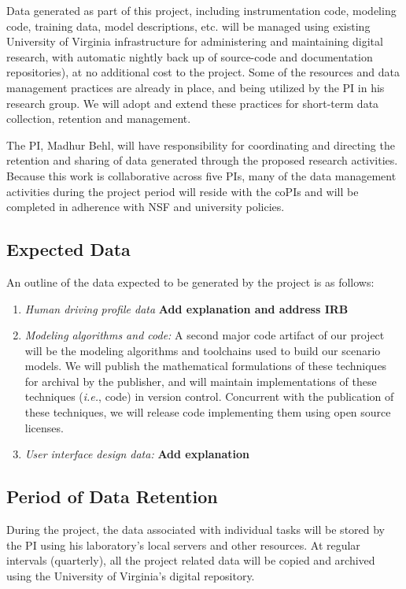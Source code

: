 
Data generated as part of this project, including instrumentation code, modeling code, training data, model descriptions, etc. will be managed using existing University of Virginia infrastructure for administering and maintaining digital research, with automatic nightly back up of source-code and documentation repositories), at no additional cost to the project. Some of the resources and data management practices are already in place, and being utilized by the PI in his research group. We will adopt and extend these practices for short-term data collection, retention and management. 

The PI, Madhur Behl, will have responsibility for coordinating and directing the retention and sharing of data generated through the proposed research activities. Because this work is collaborative across five PIs, many of the data management activities during the project period will reside with the coPIs and will be completed in adherence with NSF and university policies. 

\subsection*{Expected Data}
An outline of the data expected to be generated by the project is as follows:
\begin{enumerate}
 \item {\em Human driving profile data}
\textbf{Add explanation and address IRB}
 \item {\em Modeling algorithms and code:}
A second major code artifact of our project will be the modeling algorithms and toolchains used to build our scenario models. We will publish the mathematical formulations of these techniques for archival by the publisher, and will maintain implementations of these techniques ({\em i.e.}, code) in version control. Concurrent with the publication of these techniques, we will release code implementing them using open source licenses.
 
\item {\em User interface design data:}
\textbf{Add explanation}

\end{enumerate}

\subsection*{Period of Data Retention}
During the project, the data associated with individual tasks will be stored by the PI using his laboratory's local servers and other resources. At regular intervals (quarterly), all the project related data will be copied and archived using the University of Virginia's digital repository. 

